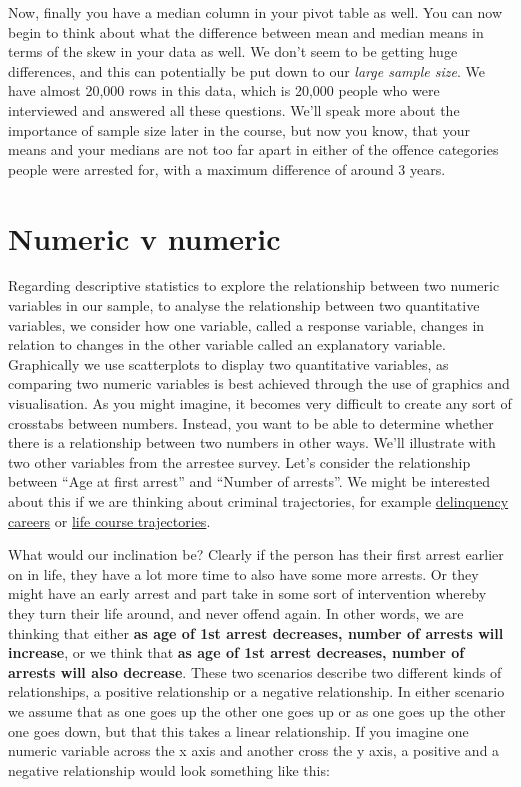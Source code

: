 \documentclass[]{book}
\theoremstyle{definition}
\theoremstyle{definition}
\theoremstyle{definition}
\theoremstyle{remark}
\begin{document}
Now, finally you have a median column in your pivot table as well. You
can now begin to think about what the difference between mean and median
means in terms of the skew in your data as well. We don't seem to be
getting huge differences, and this can potentially be put down to our
\emph{large sample size}. We have almost 20,000 rows in this data, which
is 20,000 people who were interviewed and answered all these questions.
We'll speak more about the importance of sample size later in the
course, but now you know, that your means and your medians are not too
far apart in either of the offence categories people were arrested for,
with a maximum difference of around 3 years.

\hypertarget{numeric-v-numeric}{%
\section{Numeric v numeric}\label{numeric-v-numeric}}

Regarding descriptive statistics to explore the relationship between two
numeric variables in our sample, to analyse the relationship between two
quantitative variables, we consider how one variable, called a response
variable, changes in relation to changes in the other variable called an
explanatory variable. Graphically we use scatterplots to display two
quantitative variables, as comparing two numeric variables is best
achieved through the use of graphics and visualisation. As you might
imagine, it becomes very difficult to create any sort of crosstabs
between numbers. Instead, you want to be able to determine whether there
is a relationship between two numbers in other ways. We'll illustrate
with two other variables from the arrestee survey. Let's consider the
relationship between ``Age at first arrest'' and ``Number of arrests''.
We might be interested about this if we are thinking about criminal
trajectories, for example
\href{http://www.journals.uchicago.edu/doi/abs/10.1086/449107}{delinquency
careers} or
\href{http://onlinelibrary.wiley.com/doi/10.1111/j.1745-9125.1995.tb01173.x/full}{life
course trajectories}.

What would our inclination be? Clearly if the person has their first
arrest earlier on in life, they have a lot more time to also have some
more arrests. Or they might have an early arrest and part take in some
sort of intervention whereby they turn their life around, and never
offend again. In other words, we are thinking that either \textbf{as age
of 1st arrest decreases, number of arrests will increase}, or we think
that \textbf{as age of 1st arrest decreases, number of arrests will also
decrease}. These two scenarios describe two different kinds of
relationships, a positive relationship or a negative relationship. In
either scenario we assume that as one goes up the other one goes up or
as one goes up the other one goes down, but that this takes a linear
relationship. If you imagine one numeric variable across the x axis and
another cross the y axis, a positive and a negative relationship would
look something like this:
\end{document}

